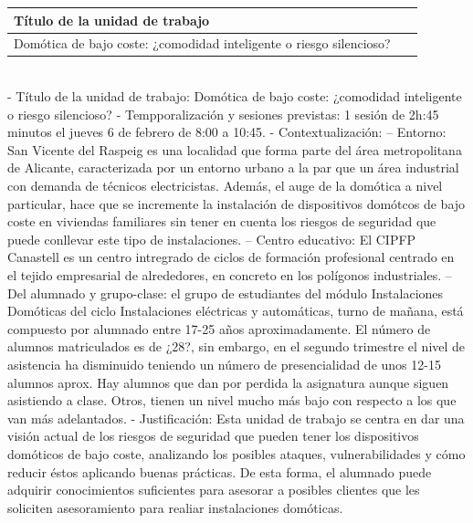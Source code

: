\documentclass[a4paper,12pt]{report}
\begin{document}
    \begin{table}[]
      \centering
      \begin{tabular}{| p{0.95\linewidth} |}
      \rowcolor[HTML]{86F1E0} 
      \hline
      \textbf{Título de la unidad de trabajo}   \\
      \hline
      Domótica de bajo coste: ¿comodidad inteligente o riesgo silencioso? \\
      \hline
      \end{tabular}
    \end{table}

    \\



     - Título de la unidad de trabajo: Domótica de bajo coste: ¿comodidad inteligente o riesgo silencioso?
    - Tempporalización y sesiones previstas: 1 sesión de 2h:45 minutos el jueves 6 de febrero de 8:00 a 10:45.
    - Contextualización: 
        -- Entorno: San Vicente del Raspeig es una localidad que forma parte del área metropolitana de Alicante, caracterizada por un entorno urbano a la par que un área industrial con demanda de técnicos electricistas. Además, el auge de la domótica a nivel particular, hace que se incremente la instalación de dispositivos domótcos de bajo coste en viviendas familiares sin tener en cuenta los riesgos de seguridad que puede conllevar este tipo de instalaciones.
        -- Centro educativo: El CIPFP Canastell es un centro intregrado de ciclos de formación profesional centrado en el tejido empresarial de alrededores, en concreto en los polígonos industriales.
        -- Del alumnado y grupo-clase: el grupo de estudiantes del módulo Instalaciones Domóticas del ciclo Instalaciones eléctricas y automáticas, turno de mañana, está compuesto por alumnado entre 17-25 años aproximadamente. El número de alumnos matriculados es de ¿28?, sin embargo, en el segundo trimestre el nivel de asistencia ha disminuido teniendo un número de presencialidad de unos 12-15 alumnos aprox. Hay alumnos que dan por perdida la asignatura aunque siguen asistiendo a clase. Otros, tienen un nivel mucho más bajo con respecto a los que van más adelantados.
    - Justificación: Esta unidad de trabajo se centra en dar una visión actual de los riesgos de seguridad que pueden tener los dispositivos domóticos de bajo coste, analizando los posibles ataques, vulnerabilidades y cómo reducir éstos aplicando buenas prácticas. De esta forma, el alumnado puede adquirir conocimientos suficientes para asesorar a posibles clientes que les soliciten asesoramiento para realiar instalaciones domóticas.
\end{document}
